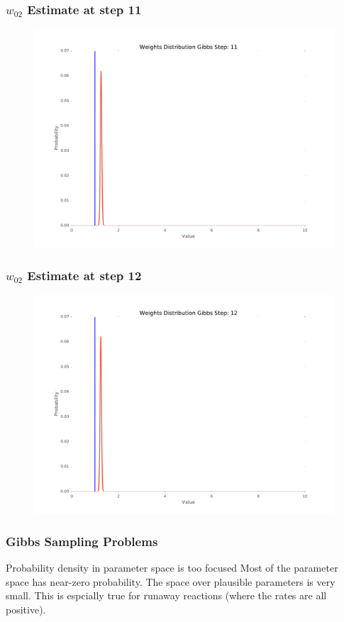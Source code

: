 \documentclass{beamer}
\begin{document}
\begin{frame}
\frametitle{$w_{02}$ Estimate at step 11}
\begin{figure}
\includegraphics[width=0.8\linewidth]{figs/11_WeDistr}
\end{figure}
\end{frame}

\begin{frame}
\frametitle{$w_{02}$ Estimate at step 12}
\begin{figure}
\includegraphics[width=0.8\linewidth]{figs/12_WeDistr}
\end{figure}
\end{frame}

\begin{frame}
\frametitle{Gibbs Sampling Problems}
\begin{block}{Probability density in parameter space is too focused}
{Most of the parameter space has near-zero probability. The space over plausible parameters is very small. This is espcially true for runaway reactions (where the rates are all positive).}
\end{block}
\end{frame}
\end{document}
